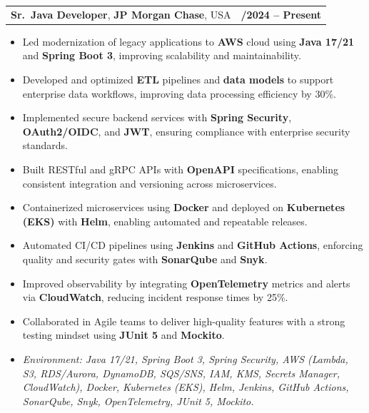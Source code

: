 \documentclass[letterpaper,11pt]{article}
\makeatletter
\newcommand{\resumeItem}[1]{
  \item\footnotesize{
    {#1 \vspace{-2pt}}
  }
}
\newcommand{\resumeSubheading}[4]{
  \vspace{-2pt}\item
    \begin{tabular*}{1.0\textwidth}[t]{l@{\extracolsep{\fill}}r}
      \textbf{\fontsize{10pt}{14pt}\selectfont #3}, \textbf{\fontsize{10pt}{14pt}\selectfont #1}, \fontsize{10pt}{14pt}\selectfont #4 & \textbf{\fontsize{10pt}{14pt}\selectfont #2} \\
    \end{tabular*}\vspace{-7pt}
}
\newcommand{\resumeItemListStart}{\begin{itemize}[leftmargin=*]}
\newcommand{\resumeItemListEnd}{\end{itemize}\vspace{-5pt}}
\makeatother
\begin{document}
\resumeSubheading
{JP Morgan Chase}{09/2024 -- Present}
{Sr.\ Java Developer}{USA}
\resumeItemListStart
  \resumeItem{Led modernization of legacy applications to \textbf{AWS} cloud using \textbf{Java 17/21} and \textbf{Spring Boot 3}, improving scalability and maintainability.}
  \resumeItem{Developed and optimized \textbf{ETL} pipelines and \textbf{data models} to support enterprise data workflows, improving data processing efficiency by 30\%.}
  \resumeItem{Implemented secure backend services with \textbf{Spring Security}, \textbf{OAuth2/OIDC}, and \textbf{JWT}, ensuring compliance with enterprise security standards.}
  \resumeItem{Built RESTful and gRPC APIs with \textbf{OpenAPI} specifications, enabling consistent integration and versioning across microservices.}
  \resumeItem{Containerized microservices using \textbf{Docker} and deployed on \textbf{Kubernetes (EKS)} with \textbf{Helm}, enabling automated and repeatable releases.}
  \resumeItem{Automated CI/CD pipelines using \textbf{Jenkins} and \textbf{GitHub Actions}, enforcing quality and security gates with \textbf{SonarQube} and \textbf{Snyk}.}
  \resumeItem{Improved observability by integrating \textbf{OpenTelemetry} metrics and alerts via \textbf{CloudWatch}, reducing incident response times by 25\%.}
  \resumeItem{Collaborated in Agile teams to deliver high-quality features with a strong testing mindset using \textbf{JUnit 5} and \textbf{Mockito}.}
  \resumeItem{\textit{Environment: Java 17/21, Spring Boot 3, Spring Security, AWS (Lambda, S3, RDS/Aurora, DynamoDB, SQS/SNS, IAM, KMS, Secrets Manager, CloudWatch), Docker, Kubernetes (EKS), Helm, Jenkins, GitHub Actions, SonarQube, Snyk, OpenTelemetry, JUnit 5, Mockito.}}
\resumeItemListEnd
\end{document}
